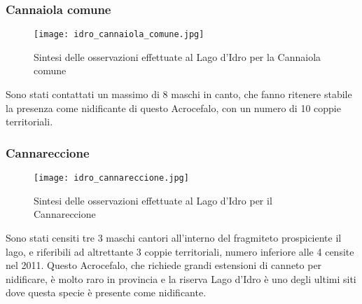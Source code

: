 \documentclass[11pt,a4paper,twoside]{memoir}
\begin{document}
\subsubsection{Cannaiola comune}
\vspace*{\fill} \begin{figure}[H]
  \centering
  \texttt{[image: idro\_cannaiola\_comune.jpg]}
  \caption{Sintesi delle osservazioni effettuate al Lago d'Idro per la Cannaiola comune}
\end{figure}\vspace*{\fill}
Sono stati contattati un massimo di 8 maschi in canto, che fanno ritenere stabile la presenza come nidificante di questo Acrocefalo, con un numero di 10 coppie  territoriali.
\subsubsection{Cannareccione}
\vspace*{\fill} \begin{figure}[H]
  \centering
  \texttt{[image: idro\_cannareccione.jpg]}
  \caption{Sintesi delle osservazioni effettuate al Lago d'Idro per il Cannareccione}
\end{figure}\vspace*{\fill}
Sono stati censiti tre  3 maschi cantori  all'interno del fragmiteto prospiciente il lago, e riferibili ad altrettante 3 coppie territoriali, numero inferiore alle 4 censite nel 2011. Questo Acrocefalo, che richiede grandi estensioni di canneto per nidificare, è molto raro in provincia e la riserva Lago d'Idro è uno degli ultimi siti dove questa specie è presente come nidificante.
\end{document}
